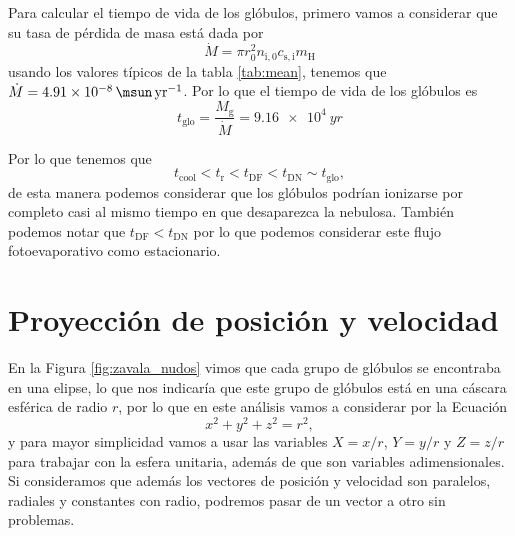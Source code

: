 \documentclass{book}
\begin{document}
Para calcular el tiempo de vida de los glóbulos, primero vamos a considerar que su tasa de pérdida de masa está dada por 
\begin{equation}
    \dot{M} =\pi r_0^2n_\mathrm{i,0}c_\mathrm{s,i}m_\mathrm{H}
\end{equation}
usando los valores típicos de la tabla \ref{tab:mean}, tenemos que $\dot{M} = \SI{4.91e-8}{\msun.yr^{-1}}$. Por lo que el tiempo de vida de los glóbulos es
\begin{equation}
    t_\mathrm{glo}=\frac{M_\mathrm{g}}{\dot{M}}=\SI{9.16e4}{yr}
\end{equation}

Por lo que tenemos que
\begin{equation}
    t_ \mathrm{cool} < t_\mathrm{r} < t_\mathrm{DF} < t_\mathrm{DN} \sim t_\mathrm{glo},
\end{equation}
de esta manera podemos considerar que los glóbulos podrían ionizarse por completo casi al mismo tiempo en que desaparezca la nebulosa. También podemos notar que $t_\mathrm{DF}<t_\mathrm{DN}$ por lo que podemos considerar este flujo fotoevaporativo como estacionario. 

\chapter{Proyección de posición y velocidad}

En la Figura \ref{fig:zavala_nudos} vimos que cada grupo de glóbulos se encontraba en una elipse, lo que nos indicaría que este grupo de glóbulos está en una cáscara esférica de radio $r$, por lo que en este análisis vamos a considerar por la Ecuación
\begin{equation}
	x^2+y^2+z^2=r^2,
\end{equation}
y para mayor simplicidad vamos a usar las variables $X=x/r$, $Y=y/r$ y $Z=z/r$ para trabajar con la esfera unitaria, además de que son variables adimensionales. Si consideramos que además los vectores de posición y velocidad son paralelos, radiales y constantes con radio, podremos pasar de un vector a otro sin problemas.
\end{document}
